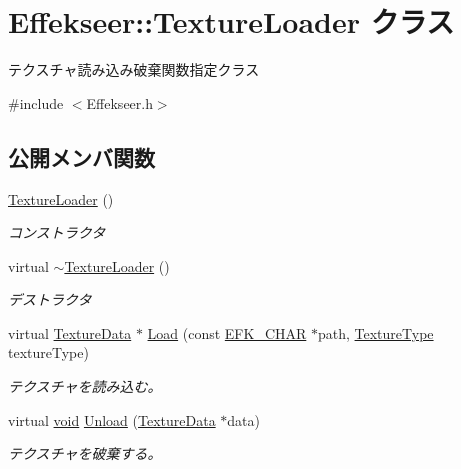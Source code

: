 \hypertarget{class_effekseer_1_1_texture_loader}{}\section{Effekseer\+:\+:Texture\+Loader クラス}
\label{class_effekseer_1_1_texture_loader}


テクスチャ読み込み破棄関数指定クラス  




{\ttfamily \#include $<$Effekseer.\+h$>$}

\subsection*{公開メンバ関数}
\begin{DoxyCompactItemize}
\item 
\mbox{\hyperlink{class_effekseer_1_1_texture_loader_a41dcac0ae6143fd422486aa504021f2c}{Texture\+Loader}} ()
\begin{DoxyCompactList}\small\item\em コンストラクタ \end{DoxyCompactList}\item 
virtual \mbox{\hyperlink{class_effekseer_1_1_texture_loader_a95b67c6e4fd84a77eb24b8e73b79ab14}{$\sim$\+Texture\+Loader}} ()
\begin{DoxyCompactList}\small\item\em デストラクタ \end{DoxyCompactList}\item 
virtual \mbox{\hyperlink{struct_effekseer_1_1_texture_data}{Texture\+Data}} $\ast$ \mbox{\hyperlink{class_effekseer_1_1_texture_loader_a91cc55233a4131d9994857dfe611460b}{Load}} (const \mbox{\hyperlink{_effekseer_8h_a50b026abea014b47854bcd835b3b6233}{E\+F\+K\+\_\+\+C\+H\+AR}} $\ast$path, \mbox{\hyperlink{namespace_effekseer_a781925ba462884c4ef87fd38ffdedba4}{Texture\+Type}} texture\+Type)
\begin{DoxyCompactList}\small\item\em テクスチャを読み込む。 \end{DoxyCompactList}\item 
virtual \mbox{\hyperlink{namespace_effekseer_ab34c4088e512200cf4c2716f168deb56}{void}} \mbox{\hyperlink{class_effekseer_1_1_texture_loader_a128fdd6e613758012fb9ceaf2881adb7}{Unload}} (\mbox{\hyperlink{struct_effekseer_1_1_texture_data}{Texture\+Data}} $\ast$data)
\begin{DoxyCompactList}\small\item\em テクスチャを破棄する。 \end{DoxyCompactList}\end{DoxyCompactItemize}


